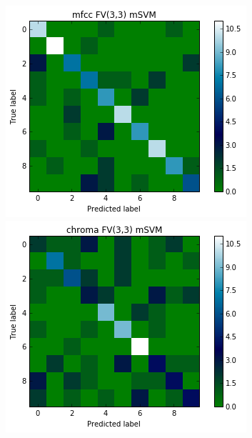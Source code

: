 \documentclass[9pt]{article}
\begin{document}
\begin{figure}[H]
    \centering
    
    \begin{minipage}[b]{0.3\textwidth}
        \includegraphics[width=\textwidth]{msvm-mfcc3-3.png}
    \end{minipage}
    \hfill
    \begin{minipage}[b]{0.3\textwidth}
        \includegraphics[width=\textwidth]{msvm-chroma3-3.png}
    \end{minipage}
    \label{fig:mSVM}
\end{figure}
\end{document}
